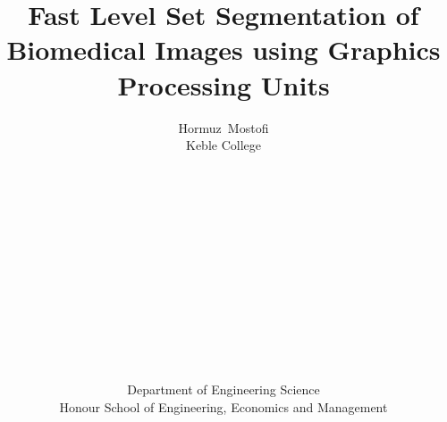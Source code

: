 \documentclass[a4paper,11pt]{report}
\begin{document}
\title{Fast Level Set Segmentation of Biomedical Images using Graphics Processing Units}
\author{Hormuz~Mostofi \\ Keble College\\ \\ \\ \\ \\\\\\\\\\\\\\\\\ \\ \\Department of Engineering Science  \\ Honour School of Engineering, Economics and Management}
\maketitle




\setcounter{tocdepth}{1}
\begin{spacing}{1.2}
\tableofcontents
\end{spacing}








\begin{spacing}{1.2}






\end{spacing}


\end{document}
